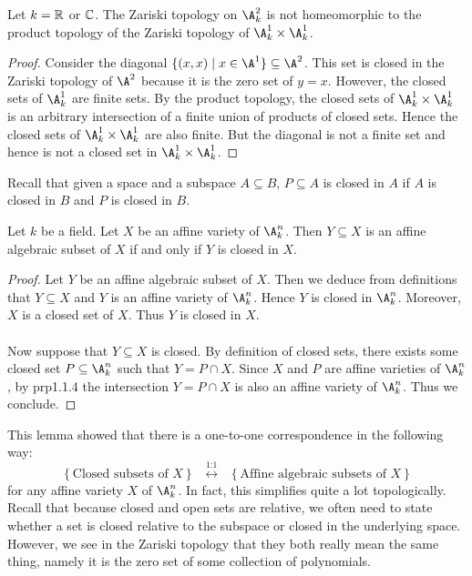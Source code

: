 \documentclass[a4paper]{article}
\begin{document}
\begin{eg}{}{} Let $k=\mathbb{R}$ or $\mathbb{C}$. The Zariski topology on $\A_k^2$ is not homeomorphic to the product topology of the Zariski topology of $\A_k^1\times\A_k^1$. 
\begin{proof}
Consider the diagonal $\{(x,x)\;|\;x\in\A^1\}\subseteq\A^2$. This set is closed in the Zariski topology of $\A^2$ because it is the zero set of $y=x$. However, the closed sets of $\A_k^1$ are finite sets. By the product topology, the closed sets of $\A_k^1\times\A_k^1$ is an arbitrary intersection of a finite union of products of closed sets. Hence the closed sets of $\A_k^1\times\A_k^1$ are also finite. But the diagonal is not a finite set and hence is not a closed set in $\A_k^1\times\A_k^1$. 
\end{proof}
\end{eg}

Recall that given a space and a subspace $A\subseteq B$, $P\subseteq A$ is closed in $A$ if $A$ is closed in $B$ and $P$ is closed in $B$. 

\begin{lmm}{}{} Let $k$ be a field. Let $X$ be an affine variety of $\A_k^n$. Then $Y\subseteq X$ is an affine algebraic subset of $X$ if and only if $Y$ is closed in $X$. 
\begin{proof}
Let $Y$ be an affine algebraic subset of $X$. Then we deduce from definitions that $Y\subseteq X$ and $Y$ is an affine variety of $\A_k^n$. Hence $Y$ is closed in $\A_k^n$. Moreover, $X$ is a closed set of $X$. Thus $Y$ is closed in $X$. \\~\\

Now suppose that $Y\subseteq X$ is closed. By definition of closed sets, there exists some closed set $P\subseteq\A_k^n$ such that $Y=P\cap X$. Since $X$ and $P$ are affine varieties of $\A_k^n$, by prp1.1.4 the intersection $Y=P\cap X$ is also an affine variety of $\A_k^n$. Thus we conclude. 
\end{proof}
\end{lmm}

This lemma showed that there is a one-to-one correspondence in the following way: $$\left\{\text{Closed subsets of }X\right\}\;\;\overset{\text{1:1}}{\longleftrightarrow}\;\;\left\{\text{Affine algebraic subsets of }X\right\}$$ for any affine variety $X$ of $\A_k^n$. In fact, this simplifies quite a lot topologically. Recall that because closed and open sets are relative, we often need to state whether a set is closed relative to the subspace or closed in the underlying space. However, we see in the Zariski topology that they both really mean the same thing, namely it is the zero set of some collection of polynomials. 
\end{document}
